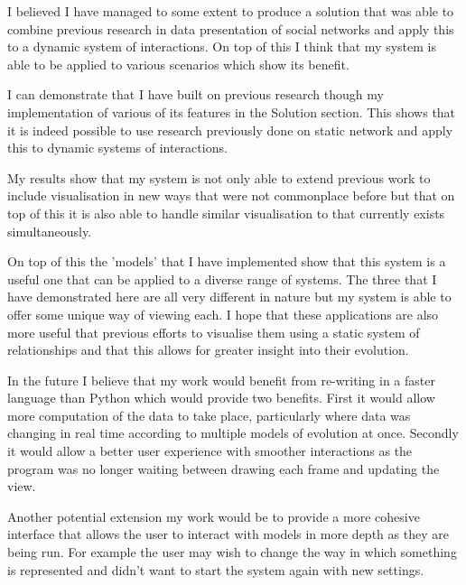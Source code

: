 \documentclass[12pt,a4paper]{article}
\begin{document}
I believed I have managed to some extent to produce a solution that was able to combine previous research in data presentation of social networks and apply this to a dynamic system of interactions. On top of this I think that my system is able to be applied to various scenarios which show its benefit.

I can demonstrate that I have built on previous research though my implementation of various of its features in the Solution section. This shows that it is indeed possible to use research previously done on static network and apply this to dynamic systems of interactions.

My results show that my system is not only able to extend previous work to include visualisation in new ways that were not commonplace before but that on top of this it is also able to handle similar visualisation to that currently exists simultaneously.

On top of this the 'models' that I have implemented show that this system is a useful one that can be applied to a diverse range of systems. The three that I have demonstrated here are all very different in nature but my system is able to offer some unique way of viewing each. I hope that these applications are also more useful that previous efforts to visualise them using a static system of relationships and that this allows for greater insight into their evolution.

In the future I believe that my work would benefit from re-writing in a faster language than Python which would provide two benefits. First it would allow more computation of the data to take place, particularly where data was changing in real time according to multiple models of evolution at once. Secondly it would allow a better user experience with smoother interactions as the program was no longer waiting between drawing each frame and updating the view.

Another potential extension my work would be to provide a more cohesive interface that allows the user to interact with models in more depth as they are being run. For example the user may wish to change the way in which something is represented and didn't want to start the system again with new settings.


\end{document}
